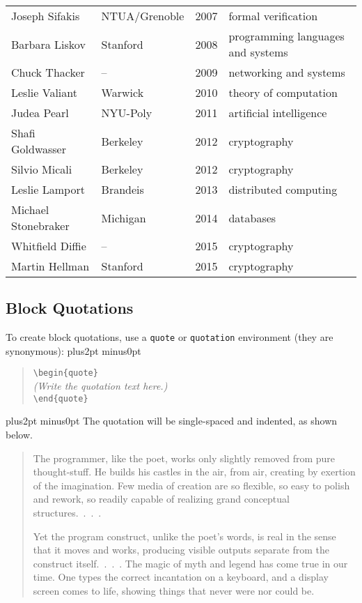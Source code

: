 \documentclass[doublespacing]{utdthesis}
\let\cite=\citep
\newenvironment{exampleclasscode}
 {\parindent=1cm\vskip0pt plus2pt minus0pt\begin{verse}}
 {\end{verse}\vskip0pt plus2pt minus0pt}
\begin{document}
\begin{table}[p]
\begin{center}
\begin{tabular}{llcp{2.5in}}
  Joseph Sifakis & NTUA/Grenoble & 2007 & formal verification \\
  Barbara Liskov & Stanford & 2008 & programming languages and systems \\
  Chuck Thacker & -- & 2009 & networking and systems \\
  Leslie Valiant & Warwick & 2010 & theory of computation \\
  Judea Pearl & NYU-Poly & 2011 & artificial intelligence \\
  Shafi Goldwasser & Berkeley & 2012 & cryptography \\
  Silvio Micali & Berkeley & 2012 & cryptography \\
  Leslie Lamport & Brandeis & 2013 & distributed computing \\
  Michael Stonebraker & Michigan & 2014 & databases \\
  Whitfield Diffie & -- & 2015 & cryptography \\
  Martin Hellman & Stanford & 2015 & cryptography \\
  \hline
  \end{tabular}
  \end{center}
\end{table}

\subsection{Block Quotations}
\label{s:quotes}

To create block quotations, use a \texttt{quote} or \texttt{quotation}
environment (they are synonymous):
\begin{exampleclasscode}
\verb|\begin{quote}| \\
\textit{(Write the quotation text here.)} \\
\verb|\end{quote}|
\end{exampleclasscode}
The quotation will be single-spaced and indented, as shown below.
\begin{quote}
The programmer, like the poet, works only slightly removed from pure
thought-stuff.
He builds his castles in the air, from air, creating by exertion of the
imagination.
Few media of creation are so flexible, so easy to polish and rework, so
readily capable of realizing grand conceptual structures.~.~.~.

Yet the program construct, unlike the poet's words, is real in the sense that
it moves and works, producing visible outputs separate from the construct
itself.~.~.~.
The magic of myth and legend has come true in our time.
One types the correct incantation on a keyboard, and a display screen comes to
life, showing things that never were nor could be.~\cite{brooks}
\end{quote}
\end{document}
